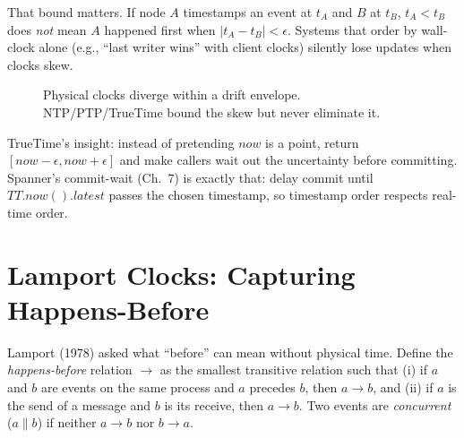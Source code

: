 That bound matters. If node $A$ timestamps an event at $t_A$ and $B$ at $t_B$, $t_A < t_B$ does \emph{not} mean $A$ happened first when $|t_A-t_B|<\epsilon$. Systems that order by wall-clock alone (e.g., ``last writer wins'' with client clocks) silently lose updates when clocks skew.

\begin{figure}[h]
\centering
{}
\caption{Physical clocks diverge within a drift envelope. NTP/PTP/TrueTime bound the skew but never eliminate it.}
\label{fig:drift}
\end{figure}

TrueTime's insight: instead of pretending $now$ is a point, return $[now-\epsilon, now+\epsilon]$ and make callers wait out the uncertainty before committing. Spanner's commit-wait (Ch.~7) is exactly that: delay commit until $TT.now().latest$ passes the chosen timestamp, so timestamp order respects real-time order.

\section{Lamport Clocks: Capturing Happens-Before}
\label{sec:lamport}
Lamport (1978) asked what ``before'' can mean without physical time. Define the \emph{happens-before} relation $\to$ as the smallest transitive relation such that (i) if $a$ and $b$ are events on the same process and $a$ precedes $b$, then $a\to b$, and (ii) if $a$ is the send of a message and $b$ is its receive, then $a\to b$. Two events are \emph{concurrent} ($a\parallel b$) if neither $a\to b$ nor $b\to a$.

